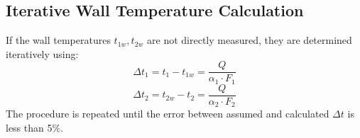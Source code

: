 \subsection{Iterative Wall Temperature Calculation}\label{wall-temp-calc}

If the wall temperatures $t_{1w}, t_{2w}$ are not directly measured, they are determined iteratively using:
\begin{equation}
    \Delta t_1 = t_1 - t_{1w} = \frac{Q}{\alpha_1 \cdot F_1}
\end{equation}
\begin{equation}
    \Delta t_2 = t_{2w} - t_2 = \frac{Q}{\alpha_2 \cdot F_2}
\end{equation}
The procedure is repeated until the error between assumed and calculated $\Delta t$ is less than 5\%.
